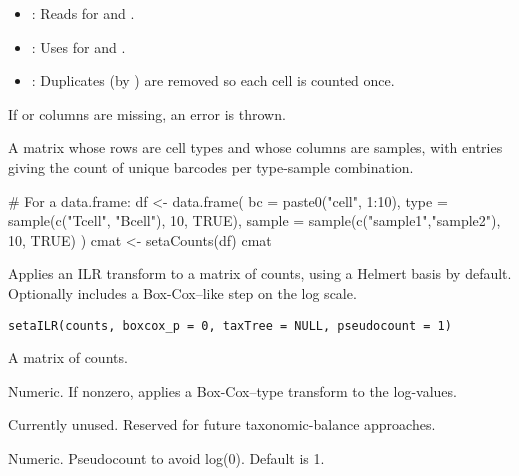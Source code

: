 \documentclass[a4paper]{book}
\begin{document}
%
\begin{Details}
\begin{itemize}

\item{} : Reads  for  and .
\item{} : Uses  for  and .
\item{} : Duplicates (by ) are removed so each cell is counted once.

\end{itemize}

If  or  columns are missing, an error is thrown.
\end{Details}
%
\begin{Value}
A matrix whose rows are cell types and whose columns are samples,
with entries giving the count of unique barcodes per type-sample combination.
\end{Value}
%
\begin{Examples}
\begin{ExampleCode}

# For a data.frame:
df <- data.frame(
  bc = paste0("cell", 1:10),
  type = sample(c("Tcell", "Bcell"), 10, TRUE),
  sample = sample(c("sample1","sample2"), 10, TRUE)
)
cmat <- setaCounts(df)
cmat


\end{ExampleCode}
\end{Examples}
%
\begin{Description}
Applies an ILR transform to a matrix of counts, using a Helmert basis by default.
Optionally includes a Box-Cox–like step on the log scale.
\end{Description}
%
\begin{Usage}
\begin{verbatim}
setaILR(counts, boxcox_p = 0, taxTree = NULL, pseudocount = 1)
\end{verbatim}
\end{Usage}
%
\begin{Arguments}
\begin{ldescription}
\item[\code{counts}] A matrix of counts.

\item[\code{boxcox\_p}] Numeric. If nonzero, applies a Box-Cox–type transform to the log-values.

\item[\code{taxTree}] Currently unused. Reserved for future taxonomic-balance approaches.

\item[\code{pseudocount}] Numeric. Pseudocount to avoid log(0). Default is 1.
\end{ldescription}
\end{Arguments}
\end{document}
